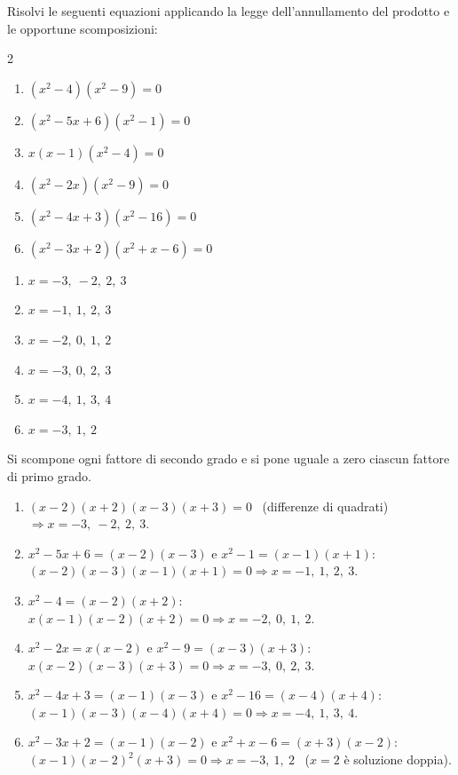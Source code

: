 \begin{question}[ID=5.5, subtitle={Legge dell'annullamento del prodotto con più fattori}, difficulty=difficile, tags={annullamento del prodotto}]
Risolvi le seguenti equazioni applicando la legge dell'annullamento del prodotto e le opportune scomposizioni:
\begin{multicols}{2}
\begin{enumerate}[leftmargin=3cm]
    \item $(x^2-4)(x^2-9)=0$
    \item $(x^2-5x+6)(x^2-1)=0$
    \item $x(x-1)(x^2-4)=0$
    \item $(x^2-2x)(x^2-9)=0$
    \item $(x^2-4x+3)(x^2-16)=0$
    \item $(x^2-3x+2)(x^2+x-6)=0$
\end{enumerate}
\end{multicols}
\begin{solution}
\begin{enumerate}
    \item $x=-3,\ -2,\ 2,\ 3$
    \item $x=-1,\ 1,\ 2,\ 3$
    \item $x=-2,\ 0,\ 1,\ 2$
    \item $x=-3,\ 0,\ 2,\ 3$
    \item $x=-4,\ 1,\ 3,\ 4$
    \item $x=-3,\ 1,\ 2$
\end{enumerate}
\end{solution}
\begin{explanation}
Si scompone ogni fattore di secondo grado e si pone uguale a zero ciascun fattore di primo grado.
\begin{enumerate}
    \item $(x-2)(x+2)(x-3)(x+3)=0$ \ (differenze di quadrati) $\Rightarrow x=-3,\ -2,\ 2,\ 3$.
    \item $x^2-5x+6=(x-2)(x-3)$ e $x^2-1=(x-1)(x+1)$: \\
    $(x-2)(x-3)(x-1)(x+1)=0 \Rightarrow x=-1,\ 1,\ 2,\ 3$.
    \item $x^2-4=(x-2)(x+2)$: \\
    $x(x-1)(x-2)(x+2)=0 \Rightarrow x=-2,\ 0,\ 1,\ 2$.
    \item $x^2-2x=x(x-2)$ e $x^2-9=(x-3)(x+3)$: \\
    $x(x-2)(x-3)(x+3)=0 \Rightarrow x=-3,\ 0,\ 2,\ 3$.
    \item $x^2-4x+3=(x-1)(x-3)$ e $x^2-16=(x-4)(x+4)$: \\
    $(x-1)(x-3)(x-4)(x+4)=0 \Rightarrow x=-4,\ 1,\ 3,\ 4$.
    \item $x^2-3x+2=(x-1)(x-2)$ e $x^2+x-6=(x+3)(x-2)$: \\
    $(x-1)(x-2)^2(x+3)=0 \Rightarrow x=-3,\ 1,\ 2$ \ ($x=2$ è soluzione doppia).
\end{enumerate}
\end{explanation}
\end{question}